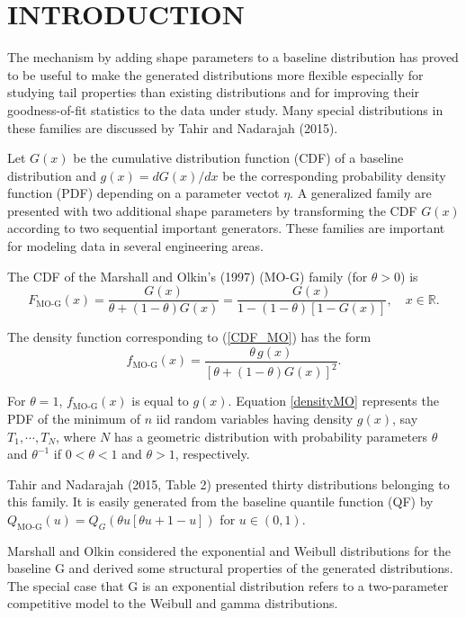 \documentclass[twoside,leqno,11pt]{article}
\begin{document}
\section{INTRODUCTION}

The mechanism by adding shape parameters to a baseline distribution has
proved to be useful to make the generated distributions more flexible especially for studying tail
properties than existing distributions and for improving their goodness-of-fit statistics
to the data under study. Many special distributions in these families are discussed by Tahir
and Nadarajah (2015).

Let $G(x)$ be the cumulative distribution function (CDF) of a
baseline distribution and $g(x)=dG(x)/dx$ be the corresponding  probability density function (PDF) depending on a
parameter vectot $\eta$. A generalized family are presented
with two additional shape parameters by transforming the CDF $G(x)$
according to two sequential important gene\-rators. These families are important for modeling data
in several engineering areas. 


The CDF of the Marshall and Olkin's (1997) ($\text{MO-G}$) family (for $\theta>0$) is
\begin{equation}\label{CDF_MO}
F_{\text{MO-G}}(x)=\frac{G(x)}{\theta+(1-\theta)G(x)}=\frac{G(x)}{1-(1-\theta)[1-G(x)]},\quad x \in \mathbb{R}.
\end{equation}

The density function corresponding to (\ref{CDF_MO}) has the form
\begin{equation}\label{densityMO}
f_{\text{MO-G}}(x)=\frac{\theta\, g(x)}{[\theta+(1-\theta)G(x)]^{2}}.
\end{equation}

For $\theta=1$, $f_{\text{MO-G}}(x)$ is equal to $g(x)$. 
Equation \eqref{densityMO} represents the PDF of the minimum of $n$ iid random variables having density $g(x)$, say $T_1,\cdots,T_N$, 
where $N$ has a geometric distribution with probability parameters $\theta$ and $\theta^{-1}$ if $0<\theta<1$ and $\theta>1$, 
respectively.

Tahir and Nadarajah (2015, Table 2) presented thirty distributions
belonging to this family. It is easily generated from the baseline quantile function (QF) by
$Q_{\text{MO-G}}(u)=Q_{G}\left(\theta u \left[\theta u+1-u\right]\right)$ for $u\in(0,1)$.

Marshall and Olkin considered the exponential and Weibull distributions for the baseline G and derived some
structural properties of the generated distributions. The special case that G is an exponential distribution
refers to a two-parameter competitive model to the Weibull and gamma distributions.
\end{document}
